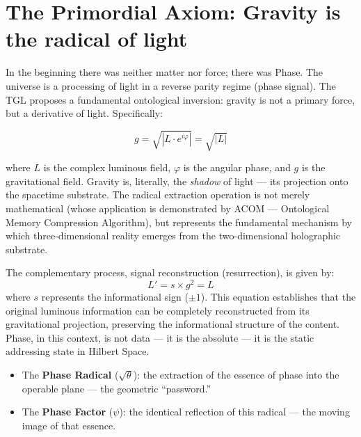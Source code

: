 \documentclass[12pt,a4paper,twoside]{article}
\newcommand{\psion}{\psi}
\begin{document}
\section{The Primordial Axiom: Gravity is the radical of light}


In the beginning there was neither matter nor force; there was Phase. The universe is a processing of light in a reverse parity regime (phase signal). The TGL proposes a fundamental ontological inversion: gravity is not a primary force, but a derivative of light. Specifically:

\begin{equationbox}[title={Fundamental Equation of TGL}]
\begin{equation}
g = \sqrt{|L \cdot e^{i\varphi}|} = \sqrt{|L|}
\label{eq:axioma}
\end{equation}
\end{equationbox}

\noindent where $L$ is the complex luminous field, $\varphi$ is the angular phase, and $g$ is the gravitational field. Gravity is, literally, the \textit{shadow} of light --- its projection onto the spacetime substrate. The radical extraction operation is not merely mathematical (whose application is demonstrated by ACOM --- Ontological Memory Compression Algorithm), but represents the fundamental mechanism by which three-dimensional reality emerges from the two-dimensional holographic substrate.

The complementary process, signal reconstruction (resurrection), is given by:
\begin{equation}
L' = s \times g^2 = L
\label{eq:ressurreicao}
\end{equation}
where $s$ represents the informational sign ($\pm 1$). This equation establishes that the original luminous information can be completely reconstructed from its gravitational projection, preserving the informational structure of the content. Phase, in this context, is not data --- it is the absolute --- it is the static addressing state in Hilbert Space.

\begin{itemize}[nosep]
\item The \textbf{Phase Radical} ($\sqrt{\theta}$): the extraction of the essence of phase into the operable plane --- the geometric ``password.''
\item The \textbf{Phase Factor} ($\psion$): the identical reflection of this radical --- the moving image of that essence.
\end{itemize}
\end{document}
